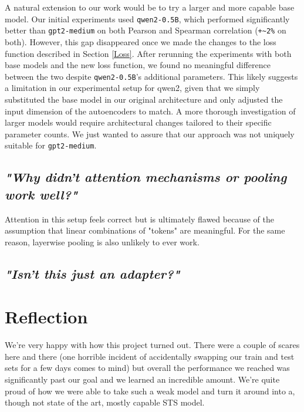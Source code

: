 \documentclass{article}
\begin{document}
A natural extension to our work would be to try a larger and more capable base model. Our initial experiments used \verb|qwen2-0.5B|, which performed significantly better than \verb|gpt2-medium| on both Pearson and Spearman correlation (\verb|+~2%| on both). However, this gap disappeared once we made the changes to the loss function described in Section \ref{Loss}. After rerunning the experiments with both base models and the new loss function, we found no meaningful difference between the two despite \verb|qwen2-0.5B|'s additional parameters. This likely suggests a limitation in our experimental setup for qwen2, given that we simply substituted the base model in our original architecture and only adjusted the input dimension of the autoencoders to match. A more thorough investigation of larger models would require architectural changes tailored to their specific parameter counts. We just wanted to assure that our approach was not uniquely suitable for \verb|gpt2-medium|.

\subsection{\textit{"Why didn't attention mechanisms or pooling work well?"}}
Attention in this setup feels correct but is ultimately flawed because of the assumption that linear combinations of "tokens" are meaningful. For the same reason, layerwise pooling is also unlikely to ever work.

\subsection{\textit{"Isn't this just an adapter?"}}

\section{Reflection}
We're very happy with how this project turned out. There were a couple of scares here and there (one horrible incident of accidentally swapping our train and test sets for a few days comes to mind) but overall the performance we reached was significantly past our goal and we learned an incredible amount. We're quite proud of how we were able to take such a weak model and turn it around into a, though not state of the art, mostly capable STS model.
\end{document}
